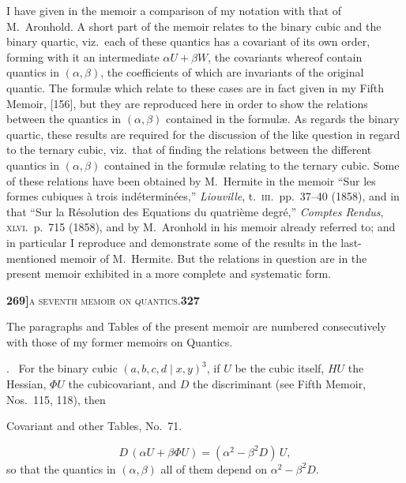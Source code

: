 \documentclass[11pt]{article}
\newcommand{\Cdel}{\mid}
\begin{document}
\noindent I have given in the memoir a comparison of my notation with that of M.~Aronhold. A short part of the memoir relates to the binary cubic and the binary quartic, viz.\ each of these quantics has a covariant of its own order, forming with it an intermediate $\alpha U + \beta W$, the covariants whereof contain quantics in $(\alpha, \beta)$, the coefficients of which are invariants of the original quantic. The formul\ae{} which relate to these cases are in fact given in my Fifth Memoir, [156], but they are reproduced here in order to show the relations between the quantics in $(\alpha, \beta)$ contained in the formul\ae. As regards the binary quartic, these results are required for the discussion of the like question in regard to the ternary cubic, viz.\ that of finding the relations between the different quantics in $(\alpha, \beta)$ contained in the formul\ae{} relating to the ternary cubic. Some of these relations have been obtained by M.~Hermite in the memoir ``Sur les formes cubiques \`a trois ind\'etermin\'ees,'' \textit{Liouville}, t.~\textsc{iii}.\ pp.~37--40 (1858), and in that ``Sur la R\'esolution des Equations du quatri\`eme degr\'e,'' \textit{Comptes Rendus}, \textsc{xlvi}.\ p.~715 (1858), and by M.~Aronhold in his memoir already referred to; and in particular I reproduce and demonstrate some of the results in the last-mentioned memoir of M.~Hermite. But the relations in question are in the present memoir exhibited in a more complete and systematic form.

\newpage
\setcounter{page}{327}

\noindent\textbf{269]}\hfill\textsc{a seventh memoir on quantics.}\hfill\textbf{327}

\medskip

\noindent The paragraphs and Tables of the present memoir are numbered consecutively with those of my former memoirs on Quantics.

\medskip

. \ For the binary cubic $(a, b, c, d\Cdel x, y)^3$, if $U$ be the cubic itself, $H U$ the Hessian, $\Phi U$ the cubicovariant, and $D$ the discriminant (see Fifth Memoir, Nos.~115, 118), then
\begin{center}Covariant and other Tables, No.~71.\end{center}
\[
   D\,(\alpha U + \beta\Phi U) = (\alpha^2 - \beta^2 D)\,U,
\]
so that the quantics in $(\alpha, \beta)$ all of them depend on $\alpha^2 - \beta^2 D$.

\medskip
\end{document}
